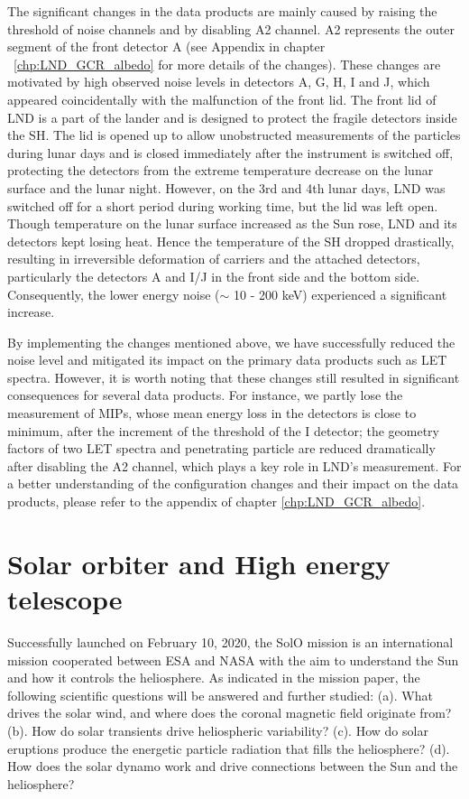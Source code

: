The significant changes in the data products are mainly caused by raising the threshold of noise channels and by disabling A2 channel. A2 represents the outer segment of the front detector A (see Appendix in chapter ~\ref{chp:LND_GCR_albedo} for more details of the changes). These changes are motivated by high observed noise levels in detectors A, G, H, I and J, which appeared coincidentally with the malfunction of the front lid. The front lid of \ac{LND} is a part of the lander and is designed to protect the fragile detectors inside the \ac{SH}. The lid is opened up to allow unobstructed measurements of the particles during lunar days and is closed immediately after the instrument is switched off, protecting the detectors from the extreme temperature decrease on the lunar surface and the lunar night. However, on the 3rd and 4th lunar days, \ac{LND} was switched off for a short period during working time, but the lid was left open. Though temperature on the lunar surface increased as the Sun rose, \ac{LND} and its detectors kept losing heat. Hence the temperature of the \ac{SH} dropped drastically, resulting in irreversible deformation of carriers and the attached detectors, particularly the detectors A and I/J in the front side and the bottom side. Consequently, the lower energy noise ($\sim$ 10 - 200 keV) experienced a significant increase.

By implementing the changes mentioned above, we have successfully reduced the noise level and mitigated its impact on the primary data products such as \ac{LET} spectra. However, it is worth noting that these changes still resulted in significant consequences for several data products. For instance, we partly lose the measurement of \acp{MIP}, whose mean energy loss in the detectors is close to minimum, after the increment of the threshold of the I detector; the geometry factors of two \ac{LET} spectra and penetrating particle are reduced dramatically after disabling the A2 channel, which plays a key role in \ac{LND}'s measurement. For a better understanding of the configuration changes and their impact on the data products, please refer to the appendix of chapter \ref{chp:LND_GCR_albedo}.

\section {Solar orbiter and High energy telescope}
\label{sec:Solar_Orbiter}
Successfully launched on February 10, 2020, the \ac{SolO} mission \citep{Mueller-2020-SolO} is an international mission cooperated between \ac{ESA} and \ac{NASA} with the aim to understand the Sun and how it controls the heliosphere. As indicated in the mission paper, the following scientific questions will be answered and further studied: (a). What drives the solar wind, and where does the coronal magnetic field originate from? (b). How do solar transients drive heliospheric variability? (c). How do solar eruptions produce the energetic particle radiation that fills the heliosphere? (d). How does the solar dynamo work and drive connections between the Sun and the heliosphere?

